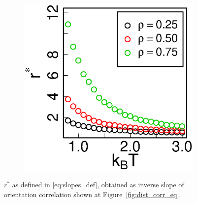 \begin{figure}[h]
\centering
\begin{subfigure}[t]{0.5\textwidth}
	\centering
	\includegraphics[width=\textwidth]{Images/correlation_length_eq}
\end{subfigure}
	\captionsetup{justification=centering, width=0.9\columnwidth}
	\caption{$r^*$ as defined in \eqref{eq:slopes_def}, obtained as inverse slope of orientation correlation shown at Figure~\ref{fig:dist_corr_eq}.}
	\label{fig:dist_corr_eq_slopes}
\end{figure}

